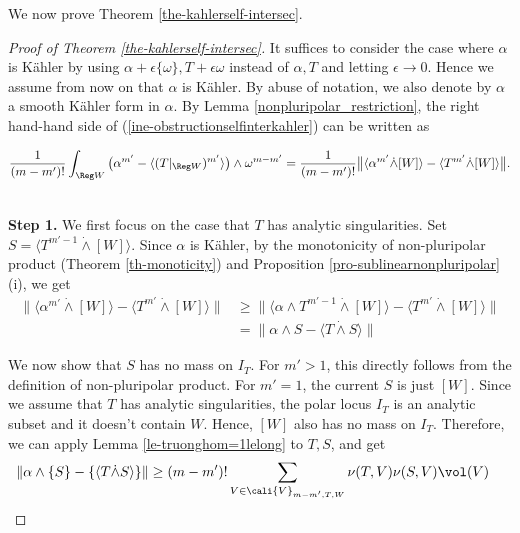     We now prove Theorem \ref{the-kahlerself-intersec}.



    \begin{proof}[Proof of Theorem \ref{the-kahlerself-intersec}]
        It suffices to consider the case where $\alpha$ is K\"ahler by using $\alpha + \epsilon\{\omega\}, T+ \epsilon \omega$ instead of $\alpha, T$ and letting $\epsilon \to 0$. Hence we assume from now on that $\alpha$ is K\"ahler. By abuse of notation, we also denote by $\alpha$ a smooth K\"ahler form in $\alpha$.  By Lemma \ref{nonpluripolar_restriction}, the right hand-hand side of (\ref{ine-obstructionselfinterkahler}) can be written as 

        \begin{align*}
            \frac{1}{(m-m')!}\int_{\Reg W} \big(\alpha^{m'}   -\langle (T|_{\Reg W})^{m'} \rangle \big) \wedge \omega^{m-m'}= \frac{1}{(m-m')!} \big\|  \langle \alpha^{m'} \dot{\wedge} [W]\rangle- \langle T^{m'} \dot{\wedge} [W] \rangle \big \|.
        \end{align*}

        \mbox{}\\
        \textbf{Step 1.} We first focus on the case that $T$ has analytic singularities. Set $S= \langle T^{m'-1} \dot{\wedge}[W] \rangle$. Since $\alpha$ is K\"ahler, by the monotonicity of non-pluripolar product (Theorem \ref{th-monoticity}) and Proposition \ref{pro-sublinearnonpluripolar} (i), we get 
        \begin{align} \label{ine-sosanhchuyenrelative}
            \big\|  \langle \alpha^{m'} \dot{\wedge} [W]\rangle- \langle T^{m'} \dot{\wedge} [W] \rangle \big \| &\ge 
            \big\|  \langle \alpha \wedge T^{m'-1} \dot{\wedge} [W]\rangle- \langle T^{m'} \dot{\wedge} [W] \rangle \big \|\\
            \nonumber
            &= \| \alpha \wedge S - \langle T \dot{\wedge} S \rangle\|
        \end{align}



        We now show that $S$ has no mass on $I_T$. For $m'>1$, this directly follows from the definition of non-pluripolar product. For $m'=1$, the current $S$ is just $[W]$. Since we assume that $T$ has analytic singularities, the polar locus $I_T$ is an analytic subset and it doesn't contain $W$. Hence, $[W]$ also has no mass on $I_T$. Therefore, we can apply Lemma \ref{le-truonghom=1lelong} to  $T,S$, and get 
        \begin{align}
            \| \alpha \wedge \{S\} - \{\langle T \dot{\wedge} S \rangle\}\|
            &\geq (m-m')! \sum_{V \in \cali{V}_{m-m',T,W}} \nu(T,V) \nu(S,V) \vol(V) \label{3.1}
        \end{align}



\end{proof}
